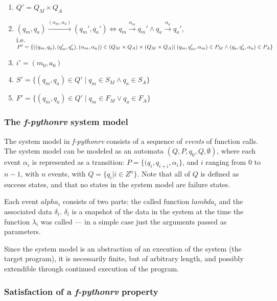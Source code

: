 \begin{enumerate}
  \item $Q' = Q_M \times Q_A$
  \item $(q_m,q_a) \xrightarrow{(\alpha_m,\alpha_a)} (q_m',q_a')
    \Leftrightarrow q_m \xrightarrow{\alpha_m} q_m' \wedge q_a \xrightarrow{\alpha_a} q_a'$,\\
    i.e.\\
    $P' = \{((q_m,q_a),(q_m',q_a'),(\alpha_m,\alpha_a)) \in (Q_M \times Q_A)
    \times (Q_M \times Q_A)\\
    | \; (q_m,q_m',\alpha_m) \in P_M \wedge (q_a,q_a',\alpha_a) \in P_A\}$
  \item $i' = (m_0,a_0)$
  \item $S' = \{(q_m,q_a) \in Q' \; | \; q_m \in S_M \wedge q_a \in S_A\}$
  \item $F' = \{(q_m,q_a) \in Q' \; | \; q_m \in F_M \vee q_a \in F_A\}$
\end{enumerate}


\subsubsection{The \textit{f-pythonrv} system model}

The system model in \textit{f-pythonrv} consists of a sequence of
\textit{events} of function calls. The system model can be modeled as an
automata $(Q, P, q_0, Q, \emptyset)$, where each event $\alpha_i$ is
represented as a transition: $P = \{(q_i, q_{i+i}, \alpha_i\}$, and $i$ ranging
from $0$ to $n-1$, with $n$ events, with $Q = \{q_i | i \in Z^n\}$. Note that
all of $Q$ is defined as success states, and that no states in the system model
are failure states.

Each event $alpha_i$ consists of two parts: the called function $lambda_i$ and
the associated data $\delta_i$. $\delta_i$ is a snapshot of the data in the
system at the time the function $\lambda_i$ was called --- in a simple case
just the arguments passed as parameters.

Since the system model is an abstraction of an execution of the system (the
target program), it is necessarily finite, but of arbitrary length, and
possibly extendible through continued execution of the program.


\subsubsection{Satisfaction of a \textit{f-pythonrv} property}


